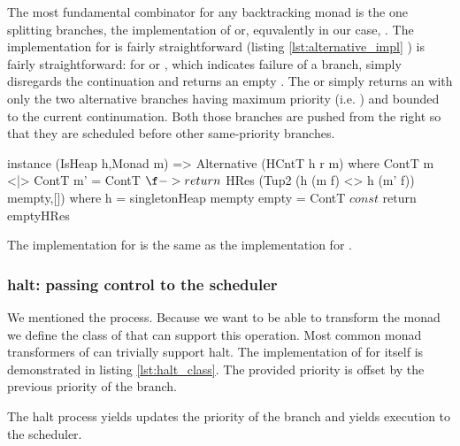 The most fundamental combinator for any backtracking monad is the one
splitting branches, the implementation of  or,
equvalently in our case, . The implementation for 
is fairly straightforward (listing \ref{lst:alternative_impl} ) is fairly
straightforward: for  or , which indicates failure of a
branch, simply disregards the continuation and returns an empty
. The  or \hask{<|>} simply returns an  with only the
two alternative branches having maximum priority (i.e. ) and bounded to the current continumation. Both those
branches are pushed from the right so that they are scheduled before
other same-priority branches.

\begin{code}
\begin{haskellcode}
instance (IsHeap h,Monad m) => Alternative (HCntT h r m) where
  ContT m <|> ContT m' = ContT $ \f -> return
    $ HRes (Tup2 (h (m f) <> h (m' f)) mempty,[])
    where
      h = singletonHeap mempty
  empty = ContT $ const $ return emptyHRes
\end{haskellcode}
  \caption{\label{lst:alternative_impl}The implementation for
     is the same as the implementation for
    .}
\end{code}


\subsubsection{halt: passing control to the scheduler}

We mentioned the   process. Because we want to
be able to transform the  monad we define the class of
 that can support this operation. Most common monad
transformers of  can trivially support halt. The
implementation of  for  itself is demonstrated
in listing \ref{lst:halt_class}. The provided priority is offset by the
previous priority of the branch.

\begin{code}
  \caption{\label{lst:halt_class}The halt process yields updates the
    priority of the branch and yields execution to the scheduler.}
\end{code}


